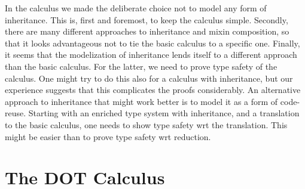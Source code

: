 \documentclass[9pt]{sigplanconf}
\begin{document}
In the calculus we made the deliberate choice not to model any form of
inheritance. This is, first and foremost, to keep the calculus simple.
Secondly, there are many different approaches to inheritance and
mixin composition, so that it looks advantageous not to tie the basic
calculus to a specific one. Finally, it seems that the modelization of
inheritance lends itself to a different approach than the basic
calculus. For the latter, we need to prove type safety of the calculus.
One might try to do this also for a calculus with inheritance, but our
experience suggests that this complicates the proofs considerably.  An
alternative approach to inheritance that might work better is to model
it as a form of code-reuse. Starting with an enriched type system with
inheritance, and a translation to the basic calculus, one needs to
show type safety wrt the translation. This might be easier than
to prove type safety wrt reduction.


\section{The DOT Calculus}
\end{document}
